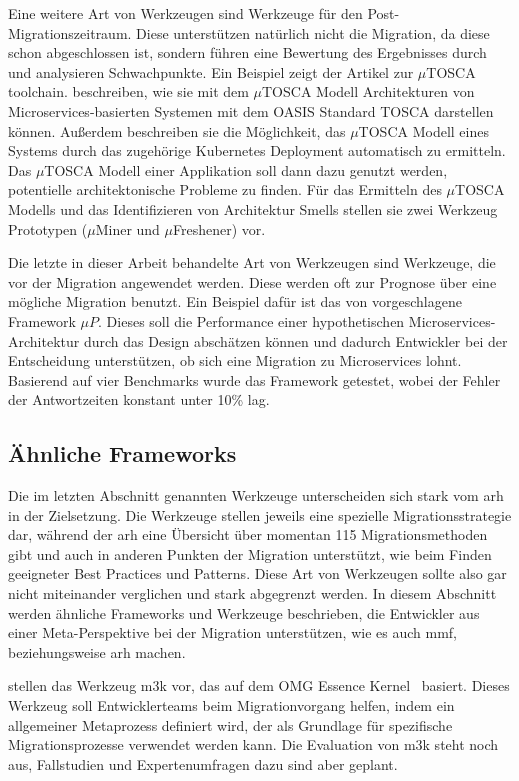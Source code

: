 Eine weitere Art von Werkzeugen sind Werkzeuge für den Post-Migrationszeitraum.
Diese unterstützen natürlich nicht die Migration, da diese schon abgeschlossen ist, sondern führen eine Bewertung des Ergebnisses durch und analysieren Schwachpunkte.
Ein Beispiel zeigt der Artikel zur $\mu$TOSCA toolchain.
 beschreiben, wie sie mit dem  $\mu$TOSCA Modell Architekturen von Microservices-basierten Systemen mit dem OASIS Standard TOSCA darstellen können.
Außerdem beschreiben sie die Möglichkeit, das $\mu$TOSCA Modell eines Systems durch das zugehörige Kubernetes Deployment automatisch zu ermitteln.
Das $\mu$TOSCA Modell einer Applikation soll dann dazu genutzt werden, potentielle architektonische Probleme zu finden.
Für das Ermitteln des $\mu$TOSCA Modells und das Identifizieren von Architektur Smells stellen sie zwei Werkzeug Prototypen ($\mu$Miner und $\mu$Freshener) vor.

Die letzte in dieser Arbeit behandelte Art von Werkzeugen sind Werkzeuge, die vor der Migration angewendet werden.
Diese werden oft zur Prognose über eine mögliche Migration benutzt.
Ein Beispiel dafür ist das von  vorgeschlagene Framework $\mu P$.
Dieses soll die Performance einer hypothetischen Microservices-Architektur durch das Design abschätzen können und dadurch Entwickler bei der Entscheidung unterstützen, ob sich eine Migration zu Microservices lohnt.
Basierend auf vier Benchmarks wurde das Framework getestet, wobei der Fehler der Antwortzeiten konstant unter 10\% lag.

\subsection{Ähnliche Frameworks}

Die im letzten Abschnitt genannten Werkzeuge unterscheiden sich stark vom \gls{arh} in der Zielsetzung.
Die Werkzeuge stellen jeweils eine spezielle Migrationsstrategie dar, während der \gls{arh} eine Übersicht über momentan 115 Migrationsmethoden gibt und auch in anderen Punkten der Migration unterstützt, wie beim Finden geeigneter Best Practices und Patterns.
Diese Art von Werkzeugen sollte also gar nicht miteinander verglichen und stark abgegrenzt werden.
In diesem Abschnitt werden ähnliche Frameworks und Werkzeuge beschrieben, die Entwickler aus einer Meta-Perspektive bei der Migration unterstützen, wie es auch \gls{mmf}, beziehungsweise \gls{arh} machen.

 stellen das Werkzeug \gls{m3k} vor, das auf dem OMG Essence Kernel~\cite{essence-kernel-omg} basiert.
Dieses Werkzeug soll Entwicklerteams beim Migrationvorgang helfen, indem ein allgemeiner Metaprozess definiert wird, der als Grundlage für spezifische Migrationsprozesse verwendet werden kann.
Die Evaluation von \gls{m3k} steht noch aus, Fallstudien und Expertenumfragen dazu sind aber geplant.

